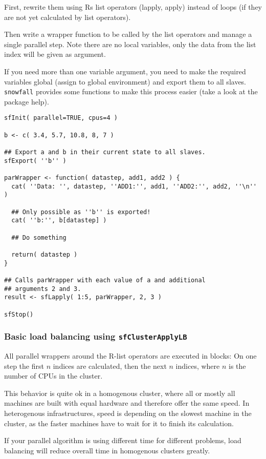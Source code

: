 \documentclass[10pt,oneside]{article}
\begin{document}
First, rewrite them using Rs list operators (lapply, apply) instead of
loops (if they are not yet calculated by list operators).

Then write a wrapper function to be called by the list operators and
manage a single parallel step. Note there are no local variables, only
the data from the list index will be given as argument.

If you need more than one variable argument, you need to make the required
variables global (assign to global environment) and export them to all
slaves. \texttt{snowfall} provides some functions to make this process
easier (take a look at the package help).

\begin{verbatim}
sfInit( parallel=TRUE, cpus=4 )

b <- c( 3.4, 5.7, 10.8, 8, 7 )

## Export a and b in their current state to all slaves.
sfExport( ''b'' )

parWrapper <- function( datastep, add1, add2 ) {
  cat( ''Data: '', datastep, ''ADD1:'', add1, ''ADD2:'', add2, ''\n'' )

  ## Only possible as ''b'' is exported!
  cat( ''b:'', b[datastep] )

  ## Do something

  return( datastep )
}

## Calls parWrapper with each value of a and additional
## arguments 2 and 3.
result <- sfLapply( 1:5, parWrapper, 2, 3 )

sfStop()
\end{verbatim}

\subsubsection{Basic load balancing using \texttt{sfClusterApplyLB}}
All parallel wrappers around the R-list operators are executed in
blocks: On one step the first $n$ indices are calculated, then the next
$n$ indices, where $n$ is the number of CPUs in the cluster.

This behavior is quite ok in a homogenous cluster, where all or mostly
all machines are built with equal hardware and therefore offer the same
speed. In heterogenous infrastructures, speed is depending on the
slowest machine in the cluster, as the faster machines have to wait for it
to finish its calculation.

If your parallel algorithm is using different time for different problems,
load balancing will reduce overall time in homogenous clusters greatly.
\end{document}
